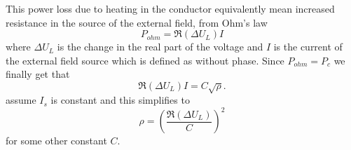 This power loss due to heating in the conductor equivalently mean increased resistance in the source of the external field, from Ohm's law
\begin{equation}
P_{ohm} = \Re(\Delta U_L) I
\end{equation}
where $\Delta U_L$ is the change in the real part of the voltage and $I$ is the current of the external field source which is defined as without phase. Since $P_{ohm} = P_{c}$ we finally get that
\begin{equation}
\Re(\Delta U_L) I = C \sqrt{\rho}.
\label{eq:resistivity}
\end{equation}
assume $I_s$ is constant and this simplifies to
\begin{equation}
\rho = \left(\frac{\Re(\Delta U_L)}{C}\right)^2
\label{eq:resistivity_simp}
\end{equation}
for some other constant $C$.